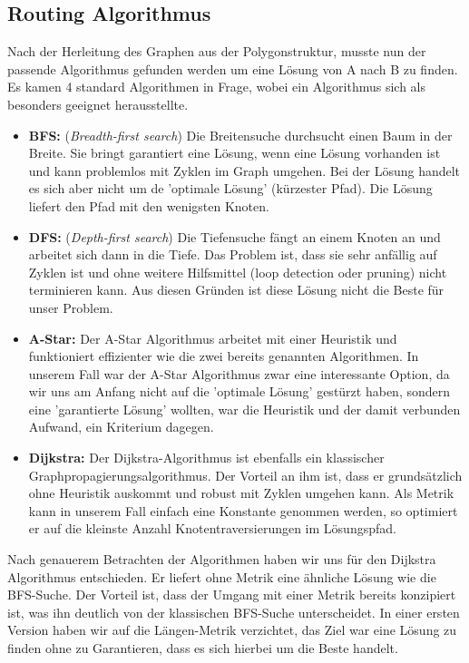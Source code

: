 \subsection{Routing Algorithmus}
Nach der Herleitung des Graphen aus der Polygonstruktur, musste nun der passende Algorithmus gefunden werden um eine Lösung von A nach B zu finden. Es kamen 4 standard Algorithmen in Frage, wobei ein Algorithmus sich als besonders geeignet herausstellte.
\begin{itemize}
	\item{\textbf{BFS:} (\textit{Breadth-first search}) Die Breitensuche durchsucht einen Baum in der Breite. Sie bringt garantiert eine Lösung, wenn eine Lösung vorhanden ist und kann problemlos mit Zyklen im Graph umgehen. Bei der Lösung handelt es sich aber nicht um de 'optimale Lösung' (kürzester Pfad). Die Lösung liefert den Pfad mit den wenigsten Knoten. \cite{AiClass}}
	\item{\textbf{DFS:} (\textit{Depth-first search}) Die Tiefensuche fängt an einem Knoten an und arbeitet sich dann in die Tiefe. Das Problem ist, dass sie sehr anfällig auf Zyklen ist und ohne weitere Hilfsmittel (loop detection oder pruning) nicht terminieren kann. Aus diesen Gründen ist diese Lösung nicht die Beste für unser Problem. \cite{AiClass}}
	\item{\textbf{A-Star:} Der A-Star Algorithmus arbeitet mit einer Heuristik und funktioniert effizienter wie die zwei bereits genannten Algorithmen. In unserem Fall war der A-Star Algorithmus zwar eine interessante Option, da wir uns am Anfang nicht auf die 'optimale Lösung' gestürzt haben, sondern eine 'garantierte Lösung' wollten, war die Heuristik und der damit verbunden Aufwand, ein Kriterium dagegen. \cite{AiClass}}
	\item{\textbf{Dijkstra:} Der Dijkstra-Algorithmus ist ebenfalls ein klassischer Graphpropagierungsalgorithmus. Der Vorteil an ihm ist, dass er grundsätzlich ohne Heuristik auskommt und robust mit Zyklen umgehen kann. Als Metrik kann in unserem Fall einfach eine Konstante genommen werden, so optimiert er auf die kleinste Anzahl Knotentraversierungen im Lösungspfad.}
\end{itemize}
Nach genauerem Betrachten der Algorithmen haben wir uns für den Dijkstra Algorithmus entschieden. Er liefert ohne Metrik eine ähnliche Lösung wie die BFS-Suche. Der Vorteil ist, dass der Umgang mit einer Metrik bereits konzipiert ist, was ihn deutlich von der klassischen BFS-Suche unterscheidet.
In einer ersten Version haben wir auf die Längen-Metrik verzichtet, das Ziel war eine Lösung zu finden ohne zu Garantieren, dass es sich hierbei um die Beste handelt.
